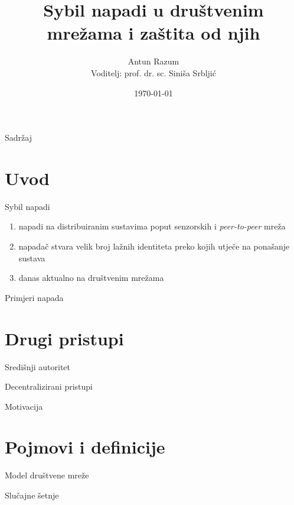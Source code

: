 \documentclass{beamer}
\title{Sybil napadi u društvenim mrežama i zaštita od njih}
\author{Antun Razum\\Voditelj: prof. dr. sc. Siniša Srbljić}
\institute{Fakultet elektrotehnike i računarstva}
\date{\today}
\begin{document}
\maketitle

\begin{frame}{Sadržaj}
  \tableofcontents
\end{frame}

\section{Uvod}

\begin{frame}{Sybil napadi}
  \begin{enumerate}
    \item napadi na distribuiranim sustavima poput senzorskih i \textit{peer-to-peer} mreža
    \item napadač stvara velik broj lažnih identiteta preko kojih utječe na ponašanje sustava
    \item danas aktualno na društvenim mrežama
  \end{enumerate}
\end{frame}

\begin{frame}{Primjeri napada}
\end{frame}

\section{Drugi pristupi}

\begin{frame}{Središnji autoritet}
\end{frame}

\begin{frame}{Decentralizirani pristupi}
\end{frame}

\begin{frame}{Motivacija}
\end{frame}

\section{Pojmovi i definicije}

\begin{frame}{Model društvene mreže}
\end{frame}

\begin{frame}{Slučajne šetnje}
\end{frame}
\end{document}
